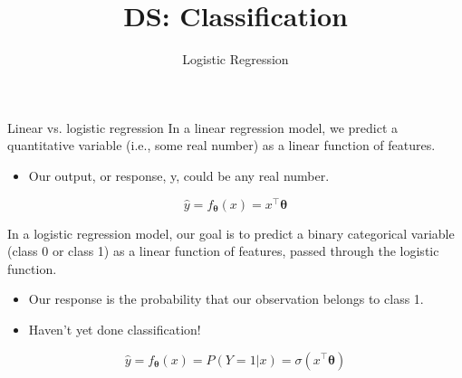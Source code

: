 \documentclass[aspectratio=169]{../latex_main/tntbeamer}  %
\title[Logistic Regression]{DS: Classification}
\subtitle{Logistic Regression}
\begin{document}
	
	\maketitle
	\begin{frame}{Linear vs. logistic regression}
	    In a linear regression model, we predict a quantitative variable (i.e., some real number) as a linear function of features.
	    \begin{itemize}
	        \item Our output, or response, y, could be any real number.
	    \end{itemize}
	    \begin{equation*}
	        \hat{y} = f_{\bm{\theta}} (x) = x^\intercal\bm{\theta}
	    \end{equation*}
	    
	    In a logistic regression model, our goal is to predict a binary categorical variable (class 0 or class 1) as a linear function of features, passed through the logistic function.
	    \begin{itemize}
	        \item Our response is the probability that our observation belongs to class 1.
	        \item Haven’t yet done classification!
	    \end{itemize}
	    \begin{equation*}
	        \hat{y} =f_{\bm{\theta}} (x) = P(Y=1|x) = \sigma (x^\intercal\bm{\theta})
	    \end{equation*}
	\end{frame}
	
\end{document}
